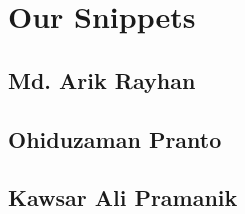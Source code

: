 \chapter{Our Snippets}

\section{Md. Arik Rayhan}

\section{Ohiduzaman Pranto}

\section{Kawsar Ali Pramanik}
